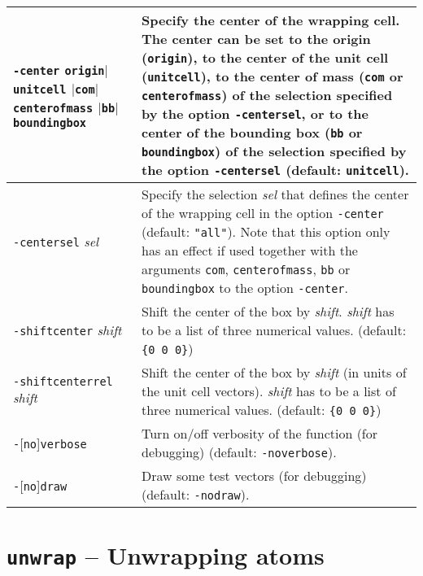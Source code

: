 \documentclass[a4paper, DIV12]{scrartcl}
\begin{document}
\begin{longtable}{|p{}|p{}|}
\texttt{-center} \texttt{origin}$|$\texttt{unitcell}\linebreak
\hspace*{1em}$|$\texttt{com}$|$\texttt{centerofmass}\linebreak 
\hspace*{1em}$|$\texttt{bb}$|$\texttt{boundingbox}
& Specify the center of the wrapping cell. The center can be set to
the origin (\texttt{origin}), to the center of the unit cell
(\texttt{unitcell}), to the center of mass (\texttt{com} or
\texttt{centerofmass}) of the selection specified by the option
\texttt{-centersel}, or to the center of the bounding box (\texttt{bb}
or \texttt{boundingbox}) of the selection specified by the option
\texttt{-centersel} (default: \texttt{unitcell}).
\\ \hline

\texttt{-centersel} \textit{sel}
& Specify the selection \textit{sel} that defines the center of the
wrapping cell in the option \texttt{-center} (default:
\texttt{"all"}). Note that this option only has an effect if used
together with the arguments \texttt{com}, \texttt{centerofmass},
\texttt{bb} or \texttt{boundingbox} to the option \texttt{-center}.
\\ \hline

\texttt{-shiftcenter} \textit{shift}
& Shift the center of the box by \textit{shift}. \textit{shift} has to
be a list of three numerical values. (default: \verb!{0 0 0}!)
\\ \hline

\texttt{-shiftcenterrel} \textit{shift}
& Shift the center of the box by \textit{shift} (in units of
the unit cell vectors). \textit{shift} has to be a list of
three numerical values. (default: \verb!{0 0 0}!)
\\ \hline

\texttt{-}[\texttt{no}]\texttt{verbose}
& Turn on/off verbosity of the function (for debugging) (default:
\texttt{-noverbose}).
\\ \hline

\texttt{-}[\texttt{no}]\texttt{draw}
& Draw some test vectors (for debugging) (default: \texttt{-nodraw}).
\\ \hline

\end{longtable}

\newpage
\section{\texttt{unwrap} -- Unwrapping atoms}
\label{sec:unwrap}
\end{document}
